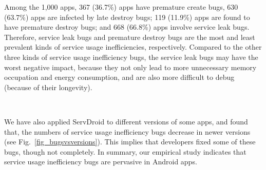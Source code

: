 \documentclass[sigconf,review, anonymous]{acmart}
\begin{document}
Among the 1,000 apps, 367 (36.7\%) apps have premature create bugs, 630 (63.7\%)
apps are infected by late destroy bugs; 119 (11.9\%) apps are found to have
premature destroy bugs; and 668 (66.8\%) apps involve service leak bugs.
Therefore, service leak bugs and premature destroy bugs are the most and least
prevalent kinds of service usage inefficiencies, respectively. Compared to the
other three kinds of service usage inefficiency bugs, the service leak
bugs may have the worst negative impact, because they not only lead to
more unnecessary memory occupation and energy consumption, and are also more
difficult to debug (because of their longevity).



\medskip
{\setlength{\parindent}{0 em}
}\\
\medskip





We have also applied \textsf{ServDroid} to different versions of some apps, and
found that, the numbers of service usage inefficiency bugs decrease in newer
versions (see Fig.~\ref{fig_bugsvsversions}). This implies that developers
fixed some of these bugs, though not completely. In summary, our empirical study
indicates that service usage inefficiency bugs are pervasive in Android apps.
\end{document}
